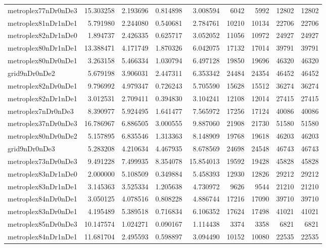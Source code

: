 \begin{longtable}{|l|r|r|r|r|r|r|r|r|}
metroplex77nDr0nDe3 & 15.303258 & 2.193696 & 0.814898 & 3.008594 & 6042 & 5992 & 12802 & 12802 \\
metroplex81nDr1nDe1 & 5.791980 & 2.244080 & 0.540681 & 2.784761 & 10210 & 10134 & 22706 & 22706 \\
metroplex82nDr1nDe0 & 1.894737 & 2.426335 & 0.625717 & 3.052052 & 11056 & 10972 & 24927 & 24927 \\
metroplex80nDr1nDe1 & 13.388471 & 4.171749 & 1.870326 & 6.042075 & 17132 & 17014 & 39791 & 39791 \\
metroplex80nDr0nDe1 & 3.263158 & 5.466334 & 1.030794 & 6.497128 & 19850 & 19696 & 46320 & 46320 \\
grid9nDr0nDe2 & 5.679198 & 3.906031 & 2.447311 & 6.353342 & 24484 & 24354 & 46452 & 46452 \\
metroplex82nDr0nDe1 & 9.796992 & 4.979347 & 0.726243 & 5.705590 & 15628 & 15512 & 36274 & 36274 \\
metroplex82nDr1nDe1 & 3.012531 & 2.709411 & 0.394830 & 3.104241 & 12108 & 12014 & 27415 & 27415 \\
metroplex7nDr0nDe3 & 8.390977 & 5.924495 & 1.641477 & 7.565972 & 17256 & 17124 & 40086 & 40086 \\
metroplex37nDr0nDe3 & 16.786967 & 6.886505 & 3.000555 & 9.887060 & 21908 & 21730 & 51580 & 51580 \\
metroplex80nDr0nDe2 & 5.157895 & 6.835546 & 1.313363 & 8.148909 & 19768 & 19618 & 46203 & 46203 \\
grid9nDr0nDe3 & 5.283208 & 4.210634 & 4.467935 & 8.678569 & 24698 & 24548 & 46743 & 46743 \\
metroplex73nDr0nDe3 & 9.491228 & 7.499935 & 8.354078 & 15.854013 & 19592 & 19428 & 45828 & 45828 \\
metroplex83nDr1nDe0 & 2.000000 & 5.108509 & 0.349884 & 5.458393 & 12930 & 12826 & 29212 & 29212 \\
metroplex83nDr1nDe1 & 3.145363 & 3.525334 & 1.205638 & 4.730972 & 9626 & 9544 & 21210 & 21210 \\
metroplex84nDr0nDe1 & 3.050125 & 4.078516 & 0.808228 & 4.886744 & 17216 & 17090 & 39710 & 39710 \\
metroplex83nDr0nDe1 & 4.195489 & 5.389518 & 0.716834 & 6.106352 & 17624 & 17498 & 41021 & 41021 \\
metroplex85nDr0nDe3 & 10.147574 & 1.024271 & 0.090167 & 1.114438 & 3374 & 3358 & 6821 & 6821 \\
metroplex84nDr1nDe1 & 11.681704 & 2.495593 & 0.598897 & 3.094490 & 10152 & 10080 & 22535 & 22535 \\

\end{longtable}
